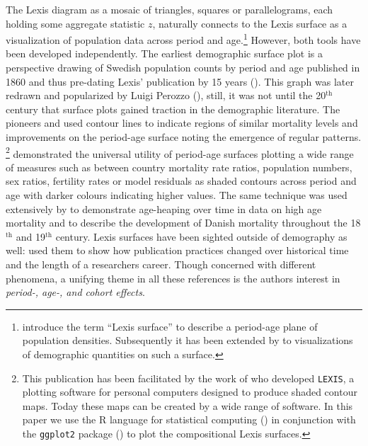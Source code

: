 \documentclass[parskip=half]{scrartcl}
\begin{document}
The Lexis diagram as a mosaic of triangles, squares or parallelograms, each holding some aggregate statistic $z$, naturally connects to the Lexis surface as a visualization of population data across period and age.\footnote{
  \textcite{Arthur1984} introduce the term \enquote{Lexis surface} to describe a period-age plane of population densities. Subsequently it has been extended by \textcite{Vaupel1987} to visualizations of demographic quantities on such a surface.
}
However, both tools have been developed independently. The earliest demographic surface plot is a perspective drawing of Swedish population counts by period and age published in 1860 and thus pre-dating Lexis' publication by 15 years (\cite{Caselli1990}). This graph was later redrawn and popularized by Luigi Perozzo (\cite{Perozzo1880}), still, it was not until the 20$^\text{th}$ century that surface plots gained traction in the demographic literature. The pioneers \textcite{Kermack1934} and \textcite{Delaporte1941} used contour lines to indicate regions of similar mortality levels and improvements on the period-age surface noting the emergence of regular patterns. \textcite{Vaupel1987}\footnote{
  This publication has been facilitated by the work of \textcite{Gambill1985} who developed \texttt{LEXIS}, a plotting software for personal computers designed to produce shaded contour maps. Today these maps can be created by a wide range of software. In this paper we use the R language for statistical computing (\cite{RCT2016}) in conjunction with the \texttt{ggplot2} package (\cite{Wickham2009}) to plot the compositional Lexis surfaces.
} demonstrated the universal utility of period-age surfaces plotting a wide range of measures such as between country mortality rate ratios, population numbers, sex ratios, fertility rates or model residuals as shaded contours across period and age with darker colours indicating higher values. The same technique was used extensively by \textcite{Andreev1999} to demonstrate age-heaping over time in data on high age mortality and to describe the development of Danish mortality throughout the 18$^\text{th}$ and 19$^\text{th}$ century. Lexis surfaces have been sighted outside of demography as well: \textcite{Sula2012} used them to show how publication practices changed over historical time and the length of a researchers career. Though concerned with different phenomena, a unifying theme in all these references is the authors interest in \emph{period-, age-, and cohort effects}.
\end{document}
